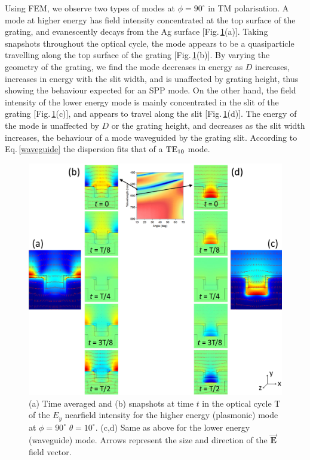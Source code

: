 Using FEM, we observe two types of modes at $\phi=90^{\circ}$ in TM polarisation. A mode at higher energy has field intensity concentrated at the top surface of the grating, and evanescently decays from the Ag surface [Fig.\,\ref{7Fig12}(a)]. Taking snapshots throughout the optical cycle, the mode appears to be a quasiparticle travelling along the top surface of the grating [Fig.\,\ref{7Fig12}(b)]. By varying the geometry of the grating, we find the mode decreases in energy as $D$ increases, increases in energy with the slit width, and is unaffected by grating height, thus showing the behaviour expected for an SPP mode. On the other hand, the field intensity of the lower energy mode is mainly concentrated in the slit of the grating [Fig.\,\ref{7Fig12}(c)], and appears to travel along the slit [Fig.\,\ref{7Fig12}(d)]. The energy of the mode is unaffected by $D$ or the grating height, and decreases as the slit width increases, the behaviour of a mode waveguided by the grating slit. According to Eq.\,\ref{waveguide} the dispersion fits that of a $\textnormal{TE}_{10}$ mode. 
\begin{figure}[h!] 
\centering    
\includegraphics[width=\textwidth]{Fig12}
\caption{(a) Time averaged and (b) snapshots at time $t$ in the optical cycle T of the $E_y$ nearfield intensity for the higher energy (plasmonic) mode at $\phi=90^{\circ}$ $\theta=10^{\circ}$. (c,d) Same as above for the lower energy (waveguide) mode. Arrows represent the size and direction of the $\vec{\mathbf{E}}$ field vector. }
\label{7Fig12}
\end{figure}

